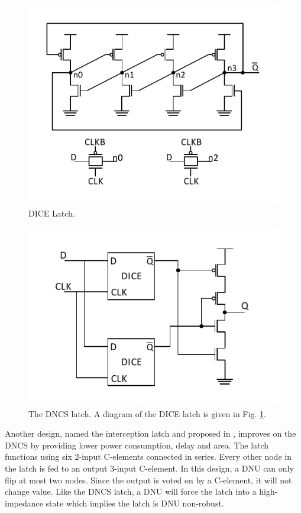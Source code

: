 \begin{figure}[!htbp]
	\centering
	\includegraphics[width=0.8\linewidth]{Figures/DICE}
	\caption{DICE Latch.}
	\label{DICE_fig}
\end{figure}

\begin{figure}[!htbp]
	\centering
	\includegraphics[width=0.8\linewidth]{Figures/DNCS}
	\caption{The DNCS latch. A diagram of the DICE latch is given in Fig. \ref{DICE_fig}.}
	\label{DNCS_fig}
\end{figure}

Another design, named the interception latch and proposed in \cite{Inter}, improves on the DNCS by providing lower power consumption, delay and area. The latch functions using six 2-input C-elements connected in series. Every other node in the latch is fed to an output 3-input C-element. In this design, a DNU can only flip at most two nodes. Since the output is voted on by a C-element, it will not change value. Like the DNCS latch, a DNU will force the latch into a high-impedance state which implies the latch is DNU non-robust.


